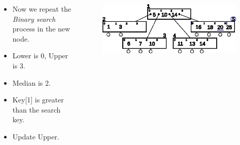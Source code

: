 \documentclass{beamer}
\begin{document}
\begin{frame}[t,allowframebreaks]
    \begin{columns}
        \begin{column}{.4\textwidth}
            \vspace{-1cm}
            \begin{block}{}
                \begin{itemize}
                    \item Now we repeat the \emph{Binary search} process in the new node.
                    \item Lower is 0, Upper is 3.
                    \item Median is 2.
                    \item Key[1] is greater than the search key.
                    \item Update Upper.
                \end{itemize}
            \end{block}
        \end{column}
        \begin{column}{.6\textwidth}
            \vspace{-1cm}
            \begin{block}{}
                \begin{figure}[h!]
                    \includegraphics[width=\linewidth]{resources/made/btree_search_step3.eps}
                \end{figure}    
                \btreeSearchStepThree
            \end{block}
        \end{column}
    \end{columns}
    \framebreak


\end{frame}
\end{document}
